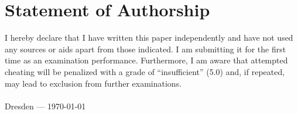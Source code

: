\documentclass{tudscrreprt}
\begin{document}


\chapter*{Statement of Authorship}

I hereby declare that I have written this paper independently and have not used any sources or aids apart from those indicated.
I am submitting it for the first time as an examination performance.
Furthermore, I am aware that attempted cheating will be penalized with a grade of “insufficient” (5.0) and, if repeated, may lead to exclusion from further examinations.
\\\\
Dresden — \today

\clearpage

\setcounter{tocdepth}{1}
\tableofcontents











\printacronyms

\begin{appendix}
  \listoffigures
  \listoftables
  \renewcommand\listoflistingscaption{List of source codes}
  \listoflistings
\end{appendix}

\printbibliography
\end{document}

